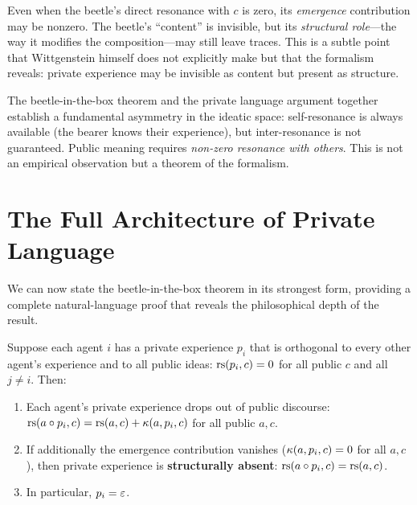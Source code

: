\begin{interpretation}
Even when the beetle's direct resonance with $c$ is zero, its \emph{emergence}
contribution may be nonzero. The beetle's ``content'' is invisible, but its
\emph{structural role}---the way it modifies the composition---may still
leave traces. This is a subtle point that Wittgenstein himself does not
explicitly make but that the formalism reveals: private experience may be
invisible as content but present as structure.
\end{interpretation}

\begin{remark}
The beetle-in-the-box theorem and the private language argument together
establish a fundamental asymmetry in the ideatic space: self-resonance is
always available (the bearer knows their experience), but inter-resonance is
not guaranteed. Public meaning requires \emph{non-zero resonance with others}.
This is not an empirical observation but a theorem of the formalism.
\end{remark}

\section{The Full Architecture of Private Language}

We can now state the beetle-in-the-box theorem in its strongest form, providing
a complete natural-language proof that reveals the philosophical depth of the
result.

\begin{theorem}
\label{thm:beetle-full}
Suppose each agent $i$ has a private experience $p_i$ that is orthogonal to
every other agent's experience and to all public ideas: $\mathrm{rs}(p_i, c) = 0$
for all public $c$ and all $j \neq i$. Then:
\begin{enumerate}
\item Each agent's private experience drops out of public discourse:
$\mathrm{rs}(a \circ p_i, c) = \mathrm{rs}(a, c) + \kappa(a, p_i, c)$ for all public $a, c$.
\item If additionally the emergence contribution vanishes
($\kappa(a, p_i, c) = 0$ for all $a, c$), then private experience is
\textbf{structurally absent}: $\mathrm{rs}(a \circ p_i, c) = \mathrm{rs}(a,c)$.
\item In particular, $p_i = \varepsilon$.
\end{enumerate}
\end{theorem}

